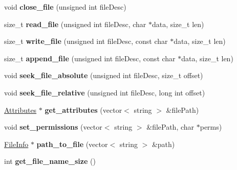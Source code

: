 \begin{DoxyCompactItemize}
\mbox{\label{classFileSystem_ac4e7222e78b352ed442f2cfd99d46a98}} 
void {\bfseries close\+\_\+file} (unsigned int file\+Desc)
\item 
\mbox{\label{classFileSystem_aa8bf729b0bad79a4c2fda24c2d1def7f}} 
size\+\_\+t {\bfseries read\+\_\+file} (unsigned int file\+Desc, char $\ast$data, size\+\_\+t len)
\item 
\mbox{\label{classFileSystem_ad8658ccba0a17c3e9b22d05aeb498c99}} 
size\+\_\+t {\bfseries write\+\_\+file} (unsigned int file\+Desc, const char $\ast$data, size\+\_\+t len)
\item 
\mbox{\label{classFileSystem_a3362c6b1cabc3497ac41542e94837e4a}} 
size\+\_\+t {\bfseries append\+\_\+file} (unsigned int file\+Desc, const char $\ast$data, size\+\_\+t len)
\item 
\mbox{\label{classFileSystem_af2d28b0d03e0595b686be6bc0e3e22b5}} 
void {\bfseries seek\+\_\+file\+\_\+absolute} (unsigned int file\+Desc, size\+\_\+t offset)
\item 
\mbox{\label{classFileSystem_aee77ad983da8db9fe2de0c13b91fe977}} 
void {\bfseries seek\+\_\+file\+\_\+relative} (unsigned int file\+Desc, long int offset)
\item 
\mbox{\label{classFileSystem_a32588895aea79931d4a09deb89ec2659}} 
\mbox{\hyperlink{classAttributes}{Attributes}} $\ast$ {\bfseries get\+\_\+attributes} (vector$<$ string $>$ \&file\+Path)
\item 
\mbox{\label{classFileSystem_abfa7e15fdbeaaaabfa3a542625c90b83}} 
void {\bfseries set\+\_\+permissions} (vector$<$ string $>$ \&file\+Path, char $\ast$perms)
\item 
\mbox{\label{classFileSystem_a6c6e95f60417b02601b72e951e7108f8}} 
\mbox{\hyperlink{classFileInfo}{File\+Info}} $\ast$ {\bfseries path\+\_\+to\+\_\+file} (vector$<$ string $>$ \&path)
\item 
\mbox{\label{classFileSystem_a0444400c1e30b7981123ba6991798c86}} 
int {\bfseries get\+\_\+file\+\_\+name\+\_\+size} ()

\end{DoxyCompactItemize}

